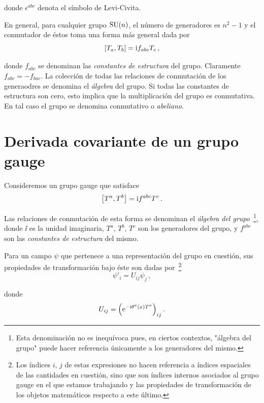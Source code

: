 \noindent donde $\epsilon^{abc}$ denota el símbolo de Levi-Civita.

En general, para cualquier grupo $\mathrm{SU}(n)$, el número de generadores es $n^2 - 1$ y el conmutador de éstos toma una forma más general dada por
%
\begin{equation}
	\comm{T_a}{T_b} = \ii f_{abc} T_c \,,
\end{equation}

\noindent donde $f_{abc}$ se denominan las \emph{constantes de estructura} del grupo. Claramente $f_{abc} = - f_{bac}$. La colección de todas las relaciones de conmutación de los generaodres se denomina el \emph{álgebra} del grupo. Si todas las constantes de estructura son cero, esto implica que la multiplicación del grupo es conmutativa. En tal caso el grupo se denomina conmutativo o \emph{abeliano}.



\section{Derivada covariante de un grupo gauge}
\label{sec:dvCovariante}

Consideremos un grupo gauge que satisface
%
\begin{equation}
    \comm{T^a}{T^b} = \ii f^{abc} T^c \,.
\end{equation}

Las relaciones de conmutación de esta forma se denominan el \emph{álgebra del grupo}~\footnote{Esta denominación no es inequívoca pues, en ciertos contextos, "álgebra del grupo" puede hacer referencia únicamente a los generadores del mismo.}, donde $\ii$ es la unidad imaginaria, $T^{a},\, T^{b},\,  T^{c}$ son los generadores del grupo, y $f^{abc}$ son las \emph{constantes de estructura} del mismo.

Para un campo $\psi$ que pertenece a una representación del grupo en cuestión, sus propiedades de transformación bajo éste son dadas por~\footnote{Los índices $i,\, j$ de estas expresiones no hacen referencia a índices espaciales de las cantidades en cuestión, sino que son índices internos asociados al grupo gauge en el que estamos trabajando y las propiedades de transformación de los objetos matemáticos respecto a este último.}
%
\begin{equation}
    \psi'_i = U_{ij} \psi_j \,,
\end{equation}

\noindent donde
%
\begin{equation}
    U_{ij} = \qty(\mathrm{e}^{-\mathrm{i} \theta^{a}(x) T^a})_{ij}\,.
\end{equation}

